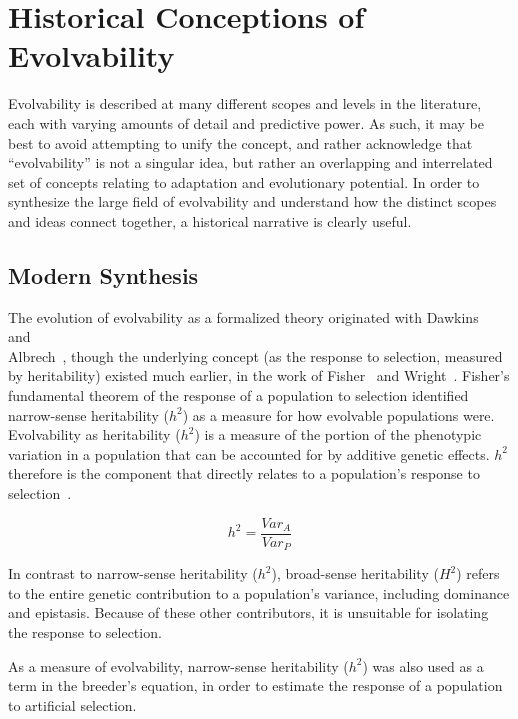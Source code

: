 \documentclass[PhD]{msu-thesis}
\begin{document}
\section{Historical Conceptions of Evolvability}
Evolvability is described at many different scopes and levels in the literature, each with varying amounts of detail and predictive power. As such, it may be best to avoid attempting to unify the concept, and rather acknowledge that “evolvability” is not a singular idea, but rather an overlapping and interrelated set of concepts relating to adaptation and evolutionary potential. In order to synthesize the large field of evolvability and understand how the distinct scopes and ideas connect together, a historical narrative is clearly useful.

\subsection{Modern Synthesis}
The evolution of evolvability as a formalized theory originated with Dawkins~\cite{dawkins_13_2003} and \\Albrech~\cite{alberch_genes_1991}, though the underlying concept (as the response to selection, measured by heritability) existed much earlier, in the work of Fisher~\cite{fisher_genetical_1930} and Wright~\cite{wright_evolution_1931}. Fisher’s fundamental theorem of the response of a population to selection identified narrow-sense heritability ($h^2$) as a measure for how evolvable populations were. Evolvability as heritability ($h^2$) is a measure of the portion of the phenotypic variation in a population that can be accounted for by additive genetic effects. $h^2$ therefore is the component that directly relates to a population’s response to selection~\cite{houle_comparing_1992}.

\begin{equation}
h^2 = \frac{Var_A}{Var_P}
\end{equation}

In contrast to narrow-sense heritability ($h^2$), broad-sense heritability ($H^2$) refers to the entire genetic contribution to a population’s variance, including dominance and epistasis. Because of these other contributors, it is unsuitable for isolating the response to selection. 

As a measure of evolvability, narrow-sense heritability ($h^2$) was also used as a term in the breeder’s equation, in order to estimate the response of a population to artificial selection.
\end{document}
